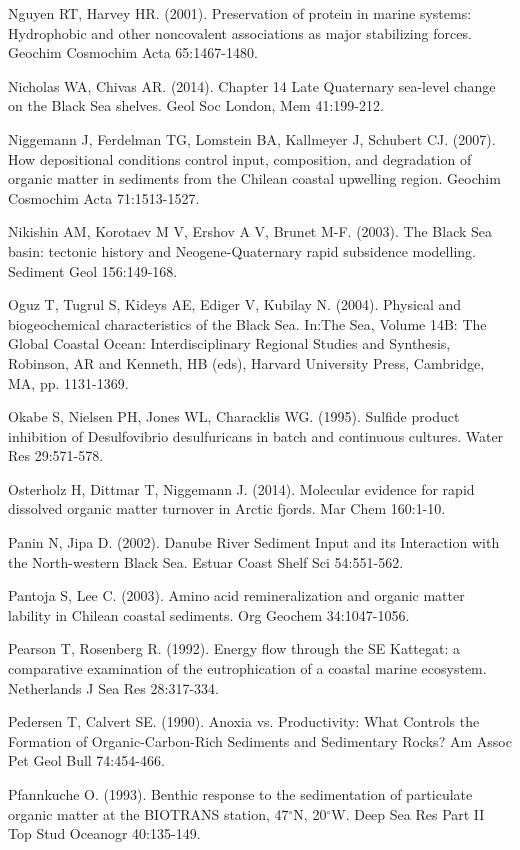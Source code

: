 Nguyen RT, Harvey HR. (2001). Preservation of protein in marine systems: Hydrophobic and other noncovalent associations as major stabilizing forces. Geochim Cosmochim Acta 65:1467-1480.

Nicholas WA, Chivas AR. (2014). Chapter 14 Late Quaternary sea-level change on the Black Sea shelves. Geol Soc London, Mem 41:199-212.

Niggemann J, Ferdelman TG, Lomstein BA, Kallmeyer J, Schubert CJ. (2007). How depositional conditions control input, composition, and degradation of organic matter in sediments from the Chilean coastal upwelling region. Geochim Cosmochim Acta 71:1513-1527.

Nikishin AM, Korotaev M V, Ershov A V, Brunet M-F. (2003). The Black Sea basin: tectonic history and Neogene-Quaternary rapid subsidence modelling. Sediment Geol 156:149-168.

Oguz T, Tugrul S, Kideys AE, Ediger V, Kubilay N. (2004). Physical and biogeochemical characteristics of the Black Sea. In:The Sea, Volume 14B: The Global Coastal Ocean: Interdisciplinary Regional Studies and Synthesis, Robinson, AR and Kenneth, HB (eds), Harvard University Press, Cambridge, MA, pp. 1131-1369.

Okabe S, Nielsen PH, Jones WL, Characklis WG. (1995). Sulfide product inhibition of Desulfovibrio desulfuricans in batch and continuous cultures. Water Res 29:571-578.

Osterholz H, Dittmar T, Niggemann J. (2014). Molecular evidence for rapid dissolved organic matter turnover in Arctic fjords. Mar Chem 160:1-10.

Panin N, Jipa D. (2002). Danube River Sediment Input and its Interaction with the North-western Black Sea. Estuar Coast Shelf Sci 54:551-562.

Pantoja S, Lee C. (2003). Amino acid remineralization and organic matter lability in Chilean coastal sediments. Org Geochem 34:1047-1056.

Pearson T, Rosenberg R. (1992). Energy flow through the SE Kattegat: a comparative examination of the eutrophication of a coastal marine ecosystem. Netherlands J Sea Res 28:317-334.

Pedersen T, Calvert SE. (1990). Anoxia vs. Productivity: What Controls the Formation of Organic-Carbon-Rich Sediments and Sedimentary Rocks? Am Assoc Pet Geol Bull 74:454-466.

Pfannkuche O. (1993). Benthic response to the sedimentation of particulate organic matter at the BIOTRANS station, 47$\ensuremath{^\circ}$N, 20$\ensuremath{^\circ}$W. Deep Sea Res Part II Top Stud Oceanogr 40:135-149.

